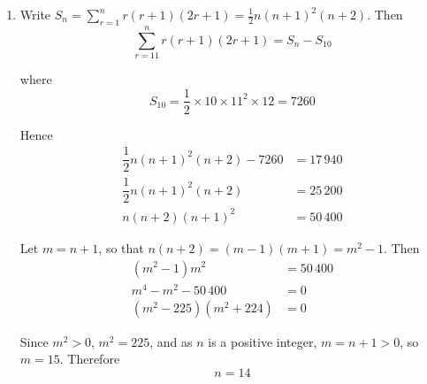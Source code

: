 \documentclass[leqno]{article}
\begin{document}
\begin{enumerate}[
  label=\textbf{\arabic*.},
  leftmargin=*,
  topsep=0pt,
  partopsep=0pt,
  parsep=0pt
]
\begin{djsSolution}
\begin{enumerate}[label=\textbf{(\alph*)}, start=1]
so
\begin{align*}
\sum_{r=1}^{n} r(r+1)(2r+1)&=2\sum_{r=1}^{n} r^3+3\sum_{r=1}^{n} r^2+\sum_{r=1}^{n} r\\
&=2\times\dfrac14 n^2(n+1)^2+3\times\dfrac16 n(n+1)(2n+1)+\dfrac12 n(n+1)\\
&=\dfrac12 n^2(n+1)^2+\dfrac12 n(n+1)(2n+1)+\dfrac12 n(n+1)\\
&=\dfrac12 n(n+1)\left[n(n+1)+(2n+1)+1\right]\\
&=\dfrac12 n(n+1)\left(n^2+3n+2\right)\\
&=\dfrac12 n(n+1)(n+1)(n+2)\\
&=\dfrac12 n(n+1)^2(n+2)
\end{align*}

This is in the form \(\frac12 n(n+a)^2(n+b)\) with \(a=1\), \(b=2\).

  \item Write \(S_n=\sum_{r=1}^{n} r(r+1)(2r+1)=\frac12 n(n+1)^2(n+2)\). Then
\[
\sum_{r=11}^{n} r(r+1)(2r+1)=S_n-S_{10}
\]

where
\[
S_{10}=\dfrac12\times10\times11^2\times12=7260
\]

Hence
\begin{align*}
\dfrac12 n(n+1)^2(n+2)-7260&=17\,940\\
\dfrac12 n(n+1)^2(n+2)&=25\,200\\
n(n+2)(n+1)^2&=50\,400
\end{align*}

Let \(m=n+1\), so that \(n(n+2)=(m-1)(m+1)=m^2-1\). Then
\begin{align*}
(m^2-1)m^2&=50\,400\\
m^4-m^2-50\,400&=0\\
(m^2-225)(m^2+224)&=0
\end{align*}

Since \(m^2>0\), \(m^2=225\), and as \(n\) is a positive integer, \(m=n+1>0\), so \(m=15\). Therefore
\[
n=14
\]

\end{enumerate}
\end{djsSolution}

\newpage

\questionitem


\end{enumerate}
\end{document}
